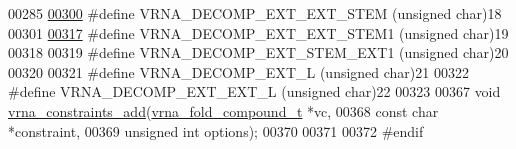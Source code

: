 \begin{DoxyCode}
00285 
\hyperlink{group__constraints_ga06efd054c9271438f6d82d4559d9e69f}{00300} \textcolor{preprocessor}{#define VRNA\_DECOMP\_EXT\_EXT\_STEM (unsigned char)18}
00301 
\hyperlink{group__constraints_ga2e75d7a77118735b32f25422d9686719}{00317} \textcolor{preprocessor}{#define VRNA\_DECOMP\_EXT\_EXT\_STEM1 (unsigned char)19}
00318 
00319 \textcolor{preprocessor}{#define VRNA\_DECOMP\_EXT\_STEM\_EXT1 (unsigned char)20}
00320 
00321 \textcolor{preprocessor}{#define VRNA\_DECOMP\_EXT\_L         (unsigned char)21}
00322 \textcolor{preprocessor}{#define VRNA\_DECOMP\_EXT\_EXT\_L     (unsigned char)22}
00323 
00367 \textcolor{keywordtype}{void} \hyperlink{group__constraints_ga35a401f680969a556858a8dd5f1d07cc}{vrna\_constraints\_add}(\hyperlink{group__fold__compound_structvrna__fc__s}{vrna\_fold\_compound\_t}  *vc,
00368                           \textcolor{keyword}{const} \textcolor{keywordtype}{char}            *constraint,
00369                           \textcolor{keywordtype}{unsigned} \textcolor{keywordtype}{int}          options);
00370 
00371 
00372 \textcolor{preprocessor}{#endif}
\end{DoxyCode}
